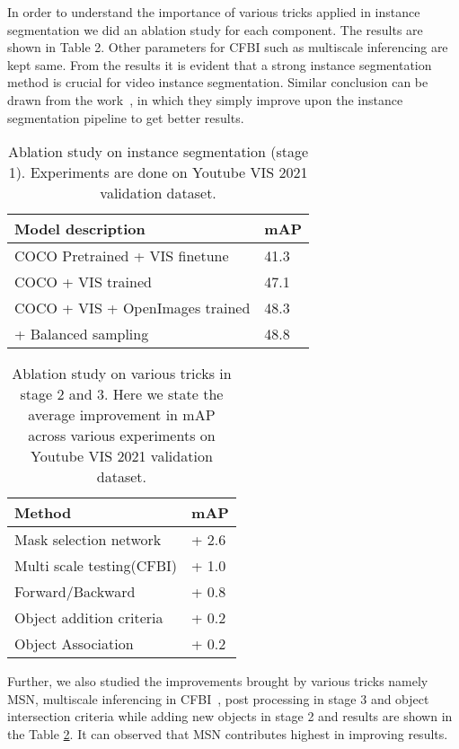 \documentclass[final]{cvpr}
\begin{document}
In order to understand the importance of various tricks applied in instance segmentation we did an ablation study for each component. The results are shown in Table 2. Other parameters for CFBI such as multiscale inferencing are kept same. From the results it is evident that a strong instance segmentation method is crucial for video instance segmentation. Similar conclusion can be drawn from the work~\cite{QueryInst}, in which they simply improve upon the instance segmentation pipeline to get better results.


\begin{table}[]
\centering

\begin{tabular}{ll}
\hline
\textbf{Model description }              & \textbf{mAP}  \\ \hline

COCO Pretrained + VIS finetune  & 41.3 \\ \hline
COCO + VIS trained              & 47.1 \\ \hline
COCO + VIS + OpenImages trained & 48.3 \\ \hline
+ Balanced sampling             & 48.8 \\ \hline
\end{tabular}
\caption{Ablation study on instance segmentation (stage 1). Experiments are done on Youtube VIS 2021 validation dataset.}
\label{tab2}
\end{table}

\begin{table}[]
\centering

\begin{tabular}{ll}
\hline
\textbf{Method}                   &  mAP \\ \hline
Mask selection network & + 2.6 \\ \hline
Multi scale testing(CFBI) &  + 1.0 \\ \hline
Forward/Backward         & + 0.8 \\ \hline
Object addition criteria & + 0.2 \\ \hline
Object Association       & + 0.2 \\ \hline
\end{tabular}
\caption{Ablation study on various tricks in stage 2 and 3. Here we state the average improvement in mAP across various experiments on Youtube VIS 2021 validation dataset.}
\label{tab:cfbi}
\end{table}

Further, we also studied the improvements brought by various tricks namely MSN, multiscale inferencing in CFBI~\cite{yang2020collaborative}, post processing in stage 3 and object intersection criteria while adding new objects in stage 2 and results are shown in the Table \ref{tab:cfbi}. It can observed that MSN contributes highest in improving results.
\end{document}
